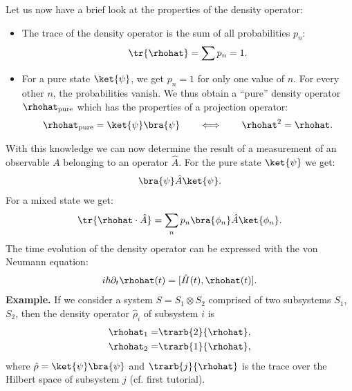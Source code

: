 Let us now have a brief look at the properties of the density operator:
\begin{itemize}
    \item The trace of the density operator is the sum of all probabilities $p_n$:
	\begin{align}
	    \tr{\rhohat} = \sum p_n = 1.
	\end{align}
	\item For a pure state $\ket{\psi}$, we get $p_n=1$ for only one value of $n$. For every other $n$, the probabilities vanish. We thus obtain a ``pure'' density operator $\rhohat_{\text{pure}}$ which has the properties of a projection operator:
	\begin{align}
					\rhohat_{\text{pure}} = \ket{\psi}\bra{\psi} \qquad \Longleftrightarrow \qquad \rhohat^2 = \rhohat.
				\end{align}
\end{itemize}
With this knowledge we can now determine the result of a measurement of an observable $A$ belonging to an operator $\hat{A}$. For the pure state $\ket{\psi}$ we get:
%
\begin{align}
				\bra{\psi} \hat{A} \ket{\psi}.
\end{align}
For a mixed state we get:
\begin{align}
	\tr{\rhohat \cdot \hat{A}} = \sum_n {p_n} \bra{\phi_n} \hat{A} \ket{\phi_n}.
\end{align}
The time evolution of the density operator can be expressed with the von Neumann equation:
\begin{align}
	i\hbar \partial_{t}\rhohat(t) = [\hat{H}(t),\rhohat(t)].
\end{align}
\textbf{Example.} 
If we consider a system $S = S_1 \otimes S_2$ comprised of two subsystems $S_1$, $S_2$, then the density operator $\hat{\rho}_i$ of  subsystem $i$ is
					\begin{align}
						\rhohat_1=&\trarb{2}{\rhohat},\\
						\rhohat_2=&\trarb{1}{\rhohat},
					\end{align}
					where $\hat{\rho}=\ket{\psi}\bra{\psi}$ and $\trarb{j}{\rhohat}$ is the trace over the Hilbert space of subsystem $j$ (cf. first tutorial).